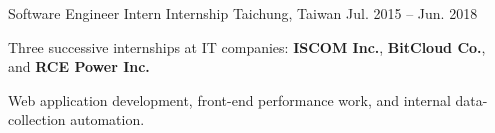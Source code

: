 \begin{cventries}
  \cventry
    {Software Engineer Intern} %
    {Internship} %
    {Taichung, Taiwan} %
    {Jul. 2015 -- Jun. 2018} %
    {
      \begin{cvitems}
        \item {Three successive internships at IT companies: \textbf{ISCOM Inc.}, \textbf{BitCloud Co.}, and \textbf{RCE Power Inc.}}
        \item {Web application development, front-end performance work, and internal data-collection automation.}
      \end{cvitems}
    }

\end{cventries}
